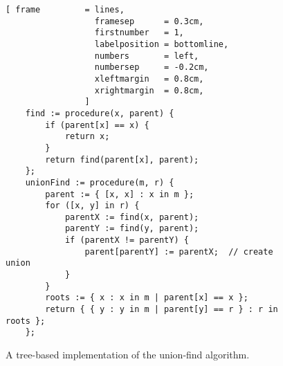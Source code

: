 \begin{figure}[!ht]
\centering
\begin{Verbatim}[ frame         = lines, 
                  framesep      = 0.3cm, 
                  firstnumber   = 1,
                  labelposition = bottomline,
                  numbers       = left,
                  numbersep     = -0.2cm,
                  xleftmargin   = 0.8cm,
                  xrightmargin  = 0.8cm,
                ]
    find := procedure(x, parent) {
        if (parent[x] == x) {
            return x;
        }
        return find(parent[x], parent);
    };
    unionFind := procedure(m, r) {
        parent := { [x, x] : x in m };  
        for ([x, y] in r) {
            parentX := find(x, parent);
            parentY := find(y, parent);
            if (parentX != parentY) {
                parent[parentY] := parentX;  // create union
            }
        }
        roots := { x : x in m | parent[x] == x };
        return { { y : y in m | parent[y] == r } : r in roots };
    };
\end{Verbatim}
\vspace*{-0.3cm}
\caption{A tree-based implementation of the union-find algorithm.}
\label{fig:union-find-tree.stlx}
\end{figure}

